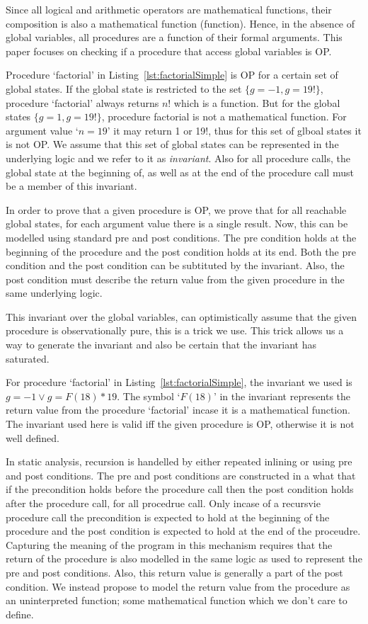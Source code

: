 \documentclass{llncs}
\newcommand{\F}{\mathit{F}}
\newcommand{\g}{\textit{g}}
\begin{document}
Since all logical and arithmetic operators are mathematical functions,
their composition is also a mathematical function (function). Hence,
in the absence of global variables, all procedures are a function of
their formal arguments. This paper focuses on checking if a procedure
that access global variables is OP. 

Procedure `factorial' in Listing~\ref{lst:factorialSimple} is OP for a
certain set of global states. If the global state is restricted to the
set $\{g = -1, g = 19!\}$, procedure `factorial' always returns $n!$
which is a function. But for the global states $\{g =1, g = 19!\}$,
procedure factorial is not a mathematical function. For argument value
`$n = 19$' it may return 1 or 19!, thus for this set of glboal states
it is not OP. We assume that this set of global states can be
represented in the underlying logic and we refer to it as
\textit{invariant}. Also for all procedure calls, the global state at
the beginning of, as well as at the end of the procedure call must be
a member of this invariant.

In order to prove that a given procedure is OP, we prove that for all
reachable global states, for each argument value there is a single
result. Now, this can be modelled using standard pre and post
conditions. The pre condition holds at the beginning of the procedure
and the post condition holds at its end. Both the pre condition and
the post condition can be subtituted by the invariant. Also, the post
condition must describe the return value from the given procedure in
the same underlying logic. 

This invariant over the global variables, can optimistically
assume that the given procedure is observationally pure, this is a
trick we use. This trick allows us a way to generate the invariant and
also be certain that the invariant has saturated.

For procedure `factorial' in Listing~\ref{lst:factorialSimple}, the
invariant we used is $\g = -1 \vee g = \F(18) * 19$. The symbol
`$\F(18)$' in the invariant represents the return value from the
procedure `factorial' incase it is a mathematical function. The
invariant used here is valid iff the given procedure is OP, otherwise
it is not well defined. 

In static analysis, recursion is handelled by either repeated inlining
or using pre and post conditions. The pre and post conditions are
constructed in a what that if the precondition holds before the
procedure call then the post condition holds after the procedure call,
for all procedrue call. Only incase of a recursvie procedure call the
precondition is expected to hold at the beginning of the procedure and
the post condition is expected to hold at the end of the proceudre. 
Capturing the meaning of the program in this mechanism requires that
the return of the procedure is also modelled in the same logic as used
to represent the pre and post conditions. Also, this return value is
generally a part of the post condition. We instead propose to
model the return value from the procedure as an uninterpreted
function; some mathematical function which we don't care to define. 
\end{document}
